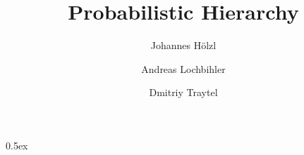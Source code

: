 \documentclass[11pt,a4paper]{article}
\begin{document}
\title{Probabilistic Hierarchy}
\author{Johannes H\"olzl \and Andreas Lochbihler \and Dmitriy Traytel}
\maketitle

\tableofcontents

\parindent 0pt\parskip 0.5ex



%
%
\end{document}
